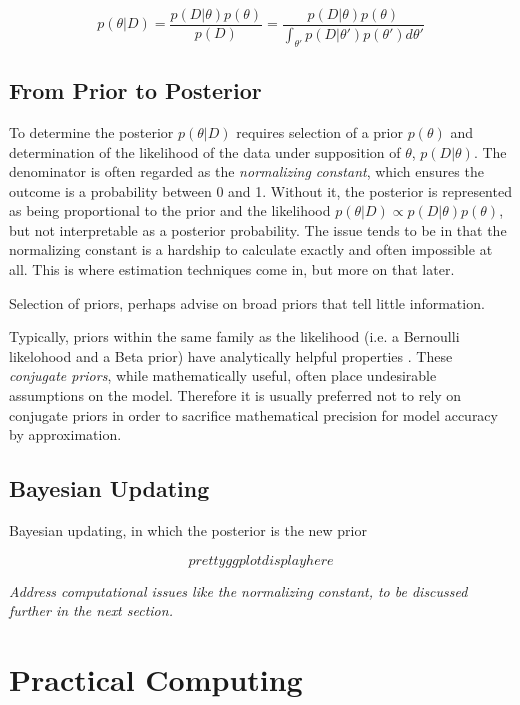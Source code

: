 $$
p(\theta|D) = \frac{p(D|\theta)p(\theta)}{p(D)} = \frac{p(D|\theta)p(\theta)}{\int_{\theta'} p(D|\theta')p(\theta')d\theta'}
$$


\subsection{From Prior to Posterior}

To determine the posterior $p(\theta|D)$ requires selection of a prior $p(\theta)$ and determination of the likelihood of the data under supposition of $\theta$, $p(D|\theta)$.  The denominator is often regarded as the \textit{normalizing constant}, which ensures the outcome is a probability between 0 and 1.  Without it, the posterior is represented as being proportional to the prior and the likelihood $p(\theta|D) \propto p(D|\theta)p(\theta)$, but not interpretable as a posterior probability.  The issue tends to be in that the normalizing constant is a hardship to calculate exactly and often impossible at all.  This is where estimation techniques come in, but more on that later.

Selection of priors, perhaps advise on broad priors that tell little information.

Typically, priors within the same family as the likelihood (i.e. a Bernoulli likelohood and a Beta prior) have analytically helpful properties \cite{mullachery2018bayesian}. These \textit{conjugate priors}, while mathematically useful, often place undesirable assumptions on the model.  Therefore it is usually preferred not to rely on conjugate priors in order to sacrifice mathematical precision for model accuracy by approximation.



\subsection{Bayesian Updating}

Bayesian updating, in which the posterior is the new prior

$$
pretty ggplot display here
$$

\textit{Address computational issues like the normalizing constant, to be discussed further in the next section.}

\section{Practical Computing} %


